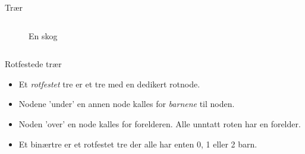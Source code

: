 \begin{frame}{Trær}
\begin{columns}
\begin{column}{0.48\textwidth}
\begin{figure}
                \caption{En skog}
            \end{figure}
        \end{column}
    \end{columns}
\end{frame}

\begin{frame}{Rotfestede trær}
    \begin{itemize}
        \item Et \emph{rotfestet} tre er et tre med en dedikert rotnode.
        \item Nodene 'under' en annen node kalles for \emph{barnene} til noden.
        \item Noden 'over' en node kalles for forelderen. Alle unntatt roten har en forelder.
        \item Et binærtre er et rotfestet tre der alle har enten 0, 1 eller 2 barn.
    \end{itemize}
    \begin{columns}
        \begin{column}{0.48\textwidth}
            \begin{figure}
\end{figure}
\end{column}
\end{columns}
\end{frame}
